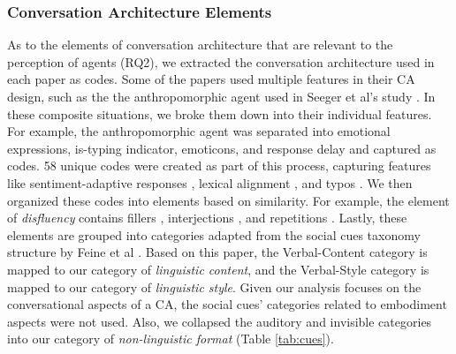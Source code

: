 \documentclass[sigconf,screen,review, anonymous]{acmart}
\newcommand{\cmt}[1]{}%
\begin{document}
\subsubsection*{Conversation Architecture Elements}
As to the elements of conversation architecture that are relevant to the perception of agents (RQ2), we extracted the conversation architecture used in each paper as codes. Some of the papers used multiple features in their CA design, such as the the anthropomorphic agent used in Seeger et al's study \cite{seeger2021chatbots}\cmt{[35]}. In these composite situations, we broke them down into their individual features. For example, the anthropomorphic agent \cite{seeger2021chatbots}\cmt{[35]} was separated into emotional expressions, is-typing indicator, emoticons, and response delay and captured as codes. 58 unique codes were created as part of this process, capturing features like sentiment-adaptive responses \cite{diederich2019emulating}\cmt{[25]}, lexical alignment \cite{spillner2021talk}\cmt{[18]}, and typos \cite{westerman2019believe}\cmt{[9]}. We then organized these codes into elements based on similarity. For example, the element of \textit{disfluency} contains fillers \cite{jeong2019exploring}\cmt{[10]}\cite{wester2015artificial}\cmt{[14]}, interjections \cite{ceha2022expressive}\cmt{[77]}\cite{hu2021enhancing}\cmt{[56]}, and repetitions \cite{yang2021effect}\cmt{[72]}. Lastly, these elements are grouped into categories adapted from the social cues taxonomy structure by Feine et al \cite{feine2019taxonomy}. Based on this paper, the Verbal-Content category is mapped to our category of \textit{linguistic content}, and the Verbal-Style category is mapped to our category of \textit{linguistic style}. Given our analysis focuses on the conversational aspects of a CA, the social cues' categories related to embodiment aspects were not used. Also, we collapsed the auditory and invisible categories into our category of \textit{non-linguistic format} (Table \ref{tab:cues}).
\end{document}
